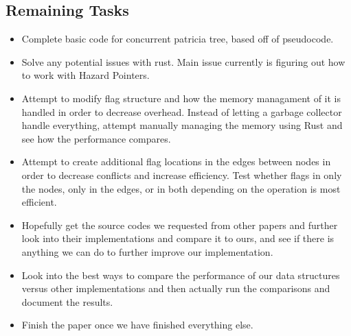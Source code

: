 \documentclass[conference]{IEEEtran}
\begin{document}
\subsection{Remaining Tasks}
\begin{itemize}
\item Complete basic code for concurrent patricia tree, based off of \cite{Shafiei2013} pseudocode. 
\item Solve any potential issues with rust. Main issue currently is figuring out how to work with Hazard Pointers.
\item Attempt to modify flag structure and how the memory managament of it is handled in order to decrease overhead. Instead of letting a garbage collector handle everything, attempt manually managing the memory using Rust and see how the performance compares. 
\item Attempt to create additional flag locations in the edges between nodes in order to decrease conflicts and increase efficiency. Test whether flags in only the nodes, only in the edges, or in both depending on the operation is most efficient.
\item Hopefully get the source codes we requested from other papers and further look into their implementations and compare it to ours, and see if there is anything we can do to further improve our implementation.
\item Look into the best ways to compare the performance of our data structures versus other implementations and then actually run the comparisons and document the results.
\item Finish the paper once we have finished everything else.
\end{itemize}




\end{document}
